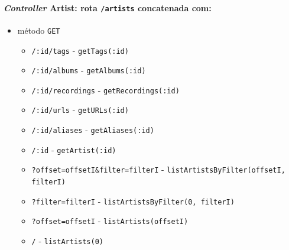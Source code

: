 \documentclass{article}
\begin{document}
\paragraph{\textit{Controller} Artist: rota \texttt{/artists} concatenada com:}
    \begin{itemize}
        \item método \texttt{GET}
            \begin{itemize}
                \item \texttt{/:id/tags} -  \texttt{getTags(:id)}
                \item \texttt{/:id/albums} - \texttt{getAlbums(:id)}
                \item \texttt{/:id/recordings} - \texttt{getRecordings(:id)}
                \item \texttt{/:id/urls} - \texttt{getURLs(:id)}
                \item \texttt{/:id/aliases} - \texttt{getAliases(:id)}
                \item \texttt{/:id} - \texttt{getArtist(:id)}
                \item \texttt{?offset=offsetI\&filter=filterI} - \texttt{listArtistsByFilter(offsetI, filterI)}
                \item \texttt{?filter=filterI} - \texttt{listArtistsByFilter(0, filterI)}
                \item \texttt{?offset=offsetI} - \texttt{listArtists(offsetI)}
                \item \texttt{/} - \texttt{listArtists(0)}
            \end{itemize}
    \end{itemize}
\end{document}
